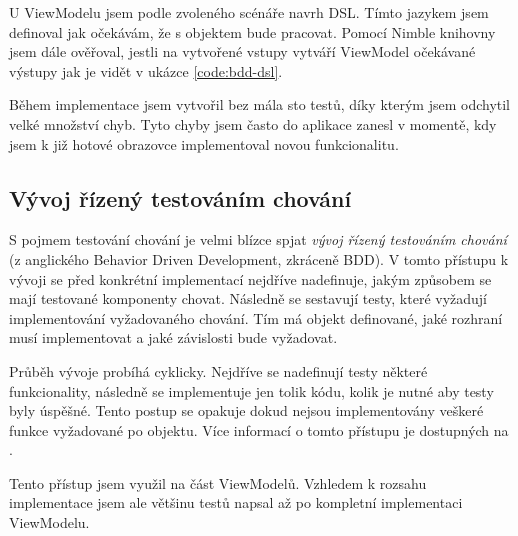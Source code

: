 U ViewModelu jsem podle zvoleného scénáře navrh DSL.
Tímto jazykem jsem definoval jak očekávám, že s objektem bude pracovat.
Pomocí Nimble knihovny jsem dále ověřoval, jestli na vytvořené vstupy vytváří ViewModel očekávané výstupy jak je vidět v ukázce \ref{code:bdd-dsl}.

Během implementace jsem vytvořil bez mála sto testů, díky kterým jsem odchytil velké množství chyb.
Tyto chyby jsem často do aplikace zanesl v momentě, kdy jsem k již hotové obrazovce implementoval novou funkcionalitu.


\subsection{Vývoj řízený testováním chování}

S pojmem testování chování je velmi blízce spjat \textit{vývoj řízený testováním chování} (z anglického Behavior Driven Development, zkráceně BDD).
V tomto přístupu k vývoji se před konkrétní implementací nejdříve nadefinuje, jakým způsobem se mají testované komponenty chovat.
Následně se sestavují testy, které vyžadují implementování vyžadovaného chování.
Tím má objekt definované, jaké rozhraní musí implementovat a jaké závislosti bude vyžadovat.

Průběh vývoje probíhá cyklicky.
Nejdříve se nadefinují testy některé funkcionality, následně se implementuje jen tolik kódu, kolik je nutné aby testy byly úspěšné.
Tento postup se opakuje dokud nejsou implementovány veškeré funkce vyžadované po objektu.
Více informací o tomto přístupu je dostupných na \cite{objcio-bdd}.

Tento přístup jsem využil na část ViewModelů.
Vzhledem k rozsahu implementace jsem ale většinu testů napsal až po kompletní implementaci ViewModelu.
